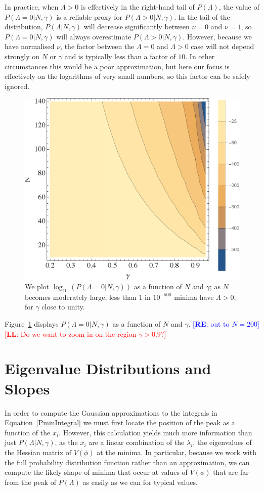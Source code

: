 \documentclass[12pt]{article}
\newcommand{\re}[1]{\textcolor{blue}{[{\bf RE}: #1]}}
\newcommand{\lfl}[1]{\textcolor{red}{[{\bf LL}: #1]}}
\begin{document}
In practice, when $\Lambda>0$ is effectively in the right-hand tail of $P(\Lambda)$,  the value of $P(\Lambda=0|N,\gamma)$ is a reliable proxy for $P(\Lambda>0|N,\gamma)$. In the tail of the distribution,  $P(\Lambda|N,\gamma)$ will decrease significantly between $\nu=0$ and $\nu=1$, so $P(\Lambda=0|N,\gamma)$ will always overestimate $P(\Lambda>0|N,\gamma)$. However, because we have normalised $\nu$, the factor between the $\Lambda=0$ and $\Lambda>0$ case will not depend strongly on $N$ or $\gamma$ and is typically less than a factor of $10$. In other circumstances this would be a poor approximation, but here our focus is effectively on the logarithms of very small numbers, so this factor can be safely ignored. 

\begin{figure} 
  \centering
  \includegraphics[width=.6 \linewidth]{histo.eps}
  \caption{We plot $\log_{10}(P(\Lambda=0|N,\gamma))$ as a function of $N$ and $\gamma$; as $N$ becomes moderately large, less than 1 in $10^{-500}$ minima have $\Lambda>0$, for $\gamma$  close to unity.  }
  \label{fullcontourplot}
\end{figure}

Figure~\ref{fullcontourplot} displays  $P(\Lambda =0 |N,\gamma)$ as a function of $N$ and $\gamma$.  \re{out to $N=200$} \lfl{Do we want to zoom in on the region $\gamma > 0.9$?}


\section{Eigenvalue Distributions and Slopes} 

In order to compute the Gaussian  approximations to the integrals in Equation~\ref{PminIntegral} we must first locate the position of the peak as a function of the $x_i$. However, this calculation yields much more information than just $P(\Lambda  |N,\gamma)$, as the $x_i$ are a linear combination of the $\lambda_i$, the eigenvalues of the Hessian matrix of $V(\phi)$ at the minima. In particular, because we work with the full probability distribution function rather than an approximation, we can compute the likely shape of minima that occur at values of $V(\phi)$ that  are  far from the peak of $P(\Lambda)$ as easily as we can for typical values.  
\end{document}
